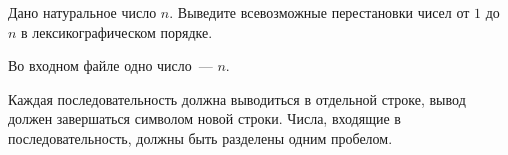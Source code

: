 Дано натуральное число $n$. Выведите всевозможные перестановки чисел от $1$ до $n$ в лексикографическом порядке.

\InputFile

Во входном файле одно число~--- $n$.

\OutputFile

Каждая последовательность должна выводиться в отдельной строке, вывод должен завершаться символом новой строки.
Числа, входящие в последовательность, должны быть разделены одним пробелом.



